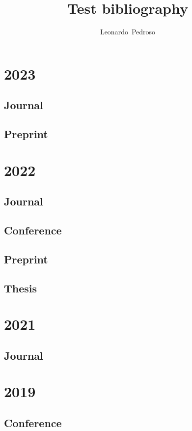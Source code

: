 \documentclass[final,5p,times,twocolumn,authoryear]{elsarticle}
\begin{document}
	\begin{frontmatter}
	\title{Test bibliography}
	\author{Leonardo~Pedroso} 
	\address[addressTUe]{Control Systems Technology section, Eindhoven University of Technology, the Netherlands}
\end{frontmatter}


\section{2023}
\subsection{Journal}
\citep{PedrosoBatista2023DistributedEKF,PedrosoBatista2023DecentralizedMHE,PedrosoBatista2023DecentralizedLQR}
\subsection{Preprint}
\citep{PedrosoHeemelsEtAl2023KarmaParallel,PaparellaPedrosoEtAl2023TwoRide-pooling}



\section{2022}
\subsection{Journal}
\citep{PedrosoBatista2022Quadruple-tank,PedrosoBatistaEtAl2022DistributedKalman,PedrosoArcoEtAl2022Spline}
\subsection{Conference}
\citep{PedrosoBatistaEtAl2022Saffron}
\subsection{Preprint}
\citep{PedrosoBatista2022DistributedRHC}
\subsection{Thesis}
\citep{Pedroso2022Thesis}

\section{2021}
\subsection{Journal}
\citep{PedrosoBatista2021SignalControl,PedrosoBatista2021SparseEquation}

\section{2019}
\subsection{Conference}
\citep{ArcoFigueirasEtAl2019Spline}

 

\end{document}
